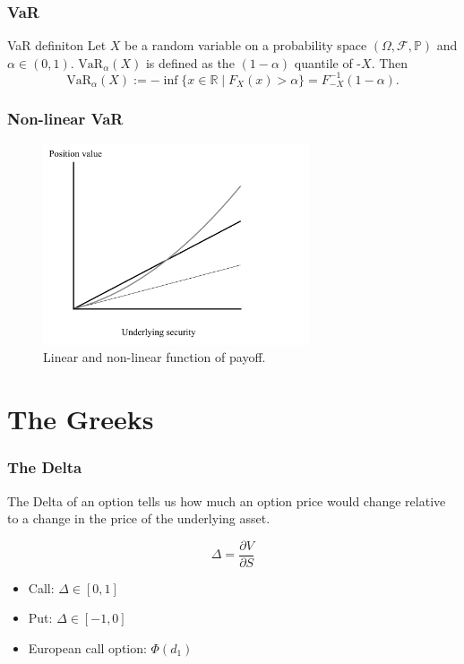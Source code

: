 \documentclass{beamer}
\newcommand{\R}{\mathbb R}
\newcommand{\f}{\mathcal F}
\begin{document}
\begin{frame}
    \frametitle{VaR}
    \begin{block}{VaR definiton}
        Let $X$ be a random variable on a probability space $(\Omega, \f, \mathbb{P})$ and $\alpha \in (0, 1)$.
        $\text{VaR}_\alpha(X)$ is defined as the $(1-\alpha)$ quantile of -$X$. Then
        $$
        \text{VaR}_\alpha(X) := - \inf \{ x \in \R \mid F_X(x) > \alpha \} = F^{-1}_{-X}(1-\alpha).
        $$
    \end{block}
\end{frame}

\begin{frame}
    \frametitle{Non-linear VaR}
    \begin{figure}\label{payoff}
        \includegraphics[width=0.7\textwidth]{payoff.jpg}
        \caption{Linear and non-linear function of payoff.}
    \end{figure}
\end{frame}

\section{The Greeks}

\begin{frame}
    \frametitle{The Delta}
    The Delta of an option tells us how much an option price 
    would change relative to a change in the price of the 
    underlying asset.\pause
    

    \begin{block}{}
        $$
        \Delta = \frac{\partial V}{\partial S}
        $$ 
    \end{block}
    \begin{itemize}
        \item<3-> Call: $\Delta\in [0,1]$
        \item<4-> Put: $\Delta\in [-1,0]$
        \item<5-> European call option: $\Phi(d_1)$
    \end{itemize}
\end{frame}
\end{document}
